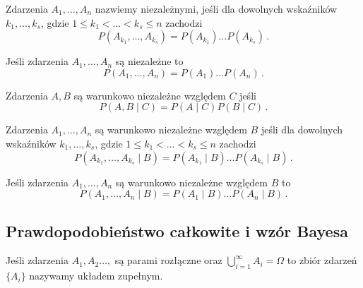 \documentclass{myclass}
\numberwithin{equation}{section}
\begin{document}
\begin{definition}
Zdarzenia \(A_1,\ldots,A_n\) nazwiemy niezależnymi, jeśli dla dowolnych wskaźników
\(k_1,\ldots,k_s\), gdzie \(1 \leq k_1 < \ldots < k_s \leq n\) zachodzi
\begin{equation*}
    P(A_{k_1},\ldots,A_{k_s}) = P(A_{k_1}) \ldots P(A_{k_s})\,.
\end{equation*}
\end{definition}

\begin{theorem}
Jeśli zdarzenia \(A_1,\ldots,A_n\) są niezależne to
\begin{equation*}
    P(A_1,\ldots,A_n) = P(A_1) \ldots P(A_n)\,.
\end{equation*}
\end{theorem}

\begin{definition}
Zdarzenia \(A,B\) są warunkowo niezależne względem \(C\) jeśli
\begin{equation*}
    P(A,B \mid C) = P(A \mid C) P(B \mid C)\,.
\end{equation*}
\end{definition}

\begin{definition}
Zdarzenia \(A_1,\ldots,A_n\) są warunkowo niezależne względem \(B\) jeśli dla dowolnych wskaźników
\(k_1,\ldots,k_s\), gdzie \(1 \leq k_1 < \ldots < k_s \leq n\) zachodzi
\begin{equation*}
    P(A_{k_1},\ldots,A_{k_s} \mid B) = P(A_{k_1} \mid B) \ldots P(A_{k_s} \mid B)\,.
\end{equation*}
\end{definition}

\begin{theorem}
Jeśli zdarzenia \(A_1,\ldots,A_n\) są warunkowo niezależne względem \(B\) to
\begin{equation*}
    P(A_1,\ldots,A_n \mid B) = P(A_1 \mid B) \ldots P(A_n \mid B)\,.
\end{equation*}
\end{theorem}


\subsection{Prawdopodobieństwo całkowite i wzór Bayesa}

\begin{definition}
Jeśli zdarzenia \(A_1,A_2\ldots,\) są parami rozłączne oraz \(\bigcup_{i=1}^\infty A_i = \Omega\) to
zbiór zdarzeń \(\{A_i\}\) nazywamy układem zupełnym.
    
\end{definition}
\end{document}
